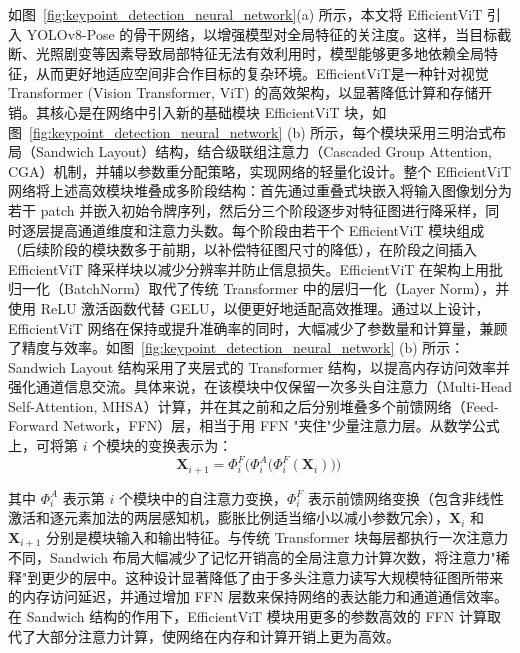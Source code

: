 如图~\ref{fig:keypoint_detection_neural_network}(a) 所示，本文将 EfficientViT 引入 YOLOv8-Pose 的骨干网络，以增强模型对全局特征的关注度。这样，当目标截断、光照剧变等因素导致局部特征无法有效利用时，模型能够更多地依赖全局特征，从而更好地适应空间非合作目标的复杂环境。EfficientViT\cite{liu2023efficientvit}是一种针对视觉 Transformer (Vision Transformer, ViT) 的高效架构，以显著降低计算和存储开销。其核心是在网络中引入新的基础模块 EfficientViT 块，如图~\ref{fig:keypoint_detection_neural_network} (b) 所示，每个模块采用三明治式布局（Sandwich Layout）结构，结合级联组注意力（Cascaded Group Attention, CGA）机制，并辅以参数重分配策略，实现网络的轻量化设计。整个 EfficientViT 网络将上述高效模块堆叠成多阶段结构：首先通过重叠式块嵌入将输入图像划分为若干 patch 并嵌入初始令牌序列，然后分三个阶段逐步对特征图进行降采样，同时逐层提高通道维度和注意力头数。每个阶段由若干个 EfficientViT 模块组成（后续阶段的模块数多于前期，以补偿特征图尺寸的降低），在阶段之间插入 EfficientViT 降采样块以减少分辨率并防止信息损失。EfficientViT 在架构上用批归一化（BatchNorm）取代了传统 Transformer 中的层归一化（Layer Norm），并使用 ReLU 激活函数代替 GELU，以便更好地适配高效推理。通过以上设计，EfficientViT 网络在保持或提升准确率的同时，大幅减少了参数量和计算量，兼顾了精度与效率。如图~\ref{fig:keypoint_detection_neural_network} (b) 所示：Sandwich Layout 结构采用了夹层式的 Transformer 结构，以提高内存访问效率并强化通道信息交流。具体来说，在该模块中仅保留一次多头自注意力（Multi-Head Self-Attention,  MHSA）计算，并在其之前和之后分别堆叠多个前馈网络（Feed-Forward Network，FFN）层，相当于用 FFN "夹住"少量注意力层。从数学公式上，可将第 $i$ 个模块的变换表示为：
\begin{equation}\label{eq:sandwich}
	\mathbf{X}_{i+1} = \Phi^F_i\Big(\Phi^A_i\big(\Phi^F_i(\mathbf{X}_i)\big)\Big)\,
\end{equation}

其中 $\Phi^A_i$ 表示第 $i$ 个模块中的自注意力变换，$\Phi^F_i$ 表示前馈网络变换（包含非线性激活和逐元素加法的两层感知机，膨胀比例适当缩小以减小参数冗余），$\mathbf{X}_i$ 和 $\mathbf{X}_{i+1}$ 分别是模块输入和输出特征。与传统 Transformer 块每层都执行一次注意力不同，Sandwich 布局大幅减少了记忆开销高的全局注意力计算次数，将注意力"稀释"到更少的层中。这种设计显著降低了由于多头注意力读写大规模特征图所带来的内存访问延迟，并通过增加 FFN 层数来保持网络的表达能力和通道通信效率。在 Sandwich 结构的作用下，EfficientViT 模块用更多的参数高效的 FFN 计算取代了大部分注意力计算，使网络在内存和计算开销上更为高效。

